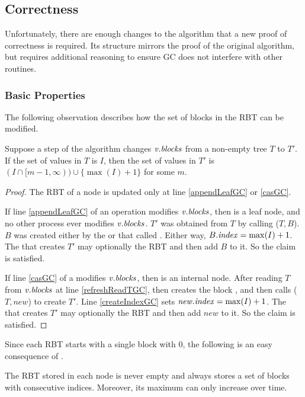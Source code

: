 
\subsection{Correctness}
Unfortunately, there are enough changes to the algorithm that a new proof of correctness
is required.  Its structure mirrors the proof of the original algorithm, but requires additional
reasoning to ensure GC does not interfere with other routines.

\subsubsection{Basic Properties}

The following observation describes
how the set of blocks in the RBT can be modified.

\begin{lemma}\label{RBTupdates}
Suppose a step of the algorithm changes $\mbox{\textnormal{\textit{v}}}.\mbox{\textit{blocks}}$ from a non-empty tree $T$ to $T'$.
If the set of  values  in $T$ is $I$, then the set of  values in $T'$ is 
$(I \cap [m-1,\infty))\cup \{\max(I) + 1\}$ for some $m$.
\end{lemma}
\begin{proof}
The RBT of a node is updated only at line \ref{appendLeafGC} or \ref{casGC}.

If line \ref{appendLeafGC} of an  operation modifies $\mbox{\textnormal{\textit{v}}}.\mbox{\textit{blocks}}$,
then  is a leaf node, and no other process ever modifies $\mbox{\textnormal{\textit{v}}}.\mbox{\textit{blocks}}$.
$T'$ was obtained from $T$ by calling ($T,B$).
$B$ was created either by the  or  that called .
Either way, $B.\mbox{\textit{index}} = \max(I)+1$.
The  that creates $T'$ may optionally  the RBT and then add $B$ to it.
So the claim is satisfied.

If line \ref{casGC} of a  modifies $\mbox{\textnormal{\textit{v}}}.\mbox{\textit{blocks}}$, then  is an internal node.
After reading $T$ from $\mbox{\textnormal{\textit{v}}}.\mbox{\textit{blocks}}$ at line \ref{refreshReadTGC},
then creates the  block ,
and then calls ($T,new$) to create $T'$.
Line \ref{createIndexGC} sets $\mbox{\textnormal{\textit{new}}}.\mbox{\textnormal{\textit{index}}} = \max(I)+1$.
The  that creates $T'$ may optionally  the RBT and then add $new$ to it.
So the claim is satisfied.
\end{proof}

Since each RBT starts with a single block with  0, the following is an easy consequence of .
\begin{corollary}\label{nonEmptyIncreasing}
The RBT stored in each node  is never empty and always stores a set of blocks with consecutive indices.
Moreover, its maximum  can only increase over time.
\end{corollary}

